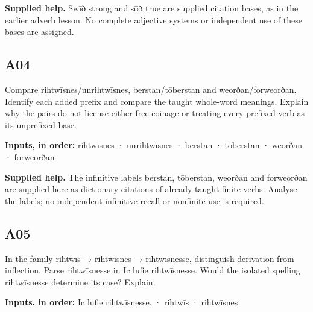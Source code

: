 \textbf{Supplied help.} Swīð strong and sōð true are supplied citation bases, as in the earlier adverb lesson. No complete adjective systems or independent use of these bases are assigned.

\par\begin{minipage}{\linewidth}\raggedright
\subsection*{A04}

Compare rihtwīsnes/\allowbreak{}unrihtwīsnes, berstan/\allowbreak{}tōberstan and weorðan/\allowbreak{}forweorðan. Identify each added prefix and compare the taught whole-word meanings. Explain why the pairs do not license either free coinage or treating every prefixed verb as its unprefixed base.

\textbf{Inputs, in order:} rihtwīsnes · unrihtwīsnes · berstan · tōberstan · weorðan · forweorðan

\end{minipage}\par\addvspace{4pt}

\textbf{Supplied help.} The infinitive labels berstan, tōberstan, weorðan and forweorðan are supplied here as dictionary citations of already taught finite verbs. Analyse the labels; no independent infinitive recall or nonfinite use is required.

\par\begin{minipage}{\linewidth}\raggedright
\subsection*{A05}

In the family rihtwīs → rihtwīsnes → rihtwīsnesse, distinguish derivation from inflection. Parse rihtwīsnesse in Ic lufie rihtwīsnesse. Would the isolated spelling rihtwīsnesse determine its case? Explain.

\textbf{Inputs, in order:} Ic lufie rihtwīsnesse. · rihtwīs · rihtwīsnes

\end{minipage}\par\addvspace{4pt}

